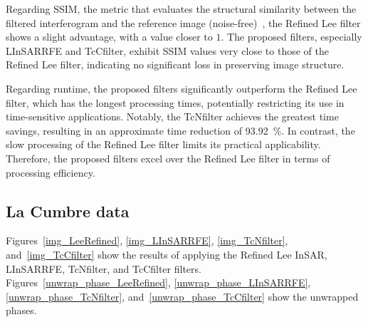 \documentclass[remotesensing,article,submit,pdftex,moreauthors]{Definitions/mdpi}
\begin{document}
Regarding SSIM, the metric that evaluates the structural similarity between the filtered interferogram and the reference image (noise-free)~\cite{ANonlocalFilterforSARInterferometric}, the Refined Lee filter shows a slight advantage, with a value closer to $1$. 
The proposed filters, especially LInSARRFE and TcCfilter, exhibit SSIM values very close to those of the Refined Lee filter, indicating no significant loss in preserving image structure. 

Regarding runtime, the proposed filters significantly outperform the Refined Lee filter, which has the longest processing times, potentially restricting its use in time-sensitive applications. 
Notably, the TcNfilter achieves the greatest time savings, resulting in an approximate time reduction of 
\qty{93.92}{\percent}. 
In contrast, the slow processing of the Refined Lee filter limits its practical applicability. 
Therefore, the proposed filters excel over the Refined Lee filter in terms of processing efficiency.

\subsection{La Cumbre data}
\label{LaCumbre}
Figures~\ref{img_LeeRefined}, \ref{img_LInSARRFE}, \ref{img_TcNfilter}, and~\ref{img_TcCfilter} show the results of applying the Refined Lee InSAR, LInSARRFE, TcNfilter, and TcCfilter filters. Figures~\ref{unwrap_phase_LeeRefined}, \ref{unwrap_phase_LInSARRFE}, \ref{unwrap_phase_TcNfilter}, and~\ref{unwrap_phase_TcCfilter} show the unwrapped phases.
\end{document}
